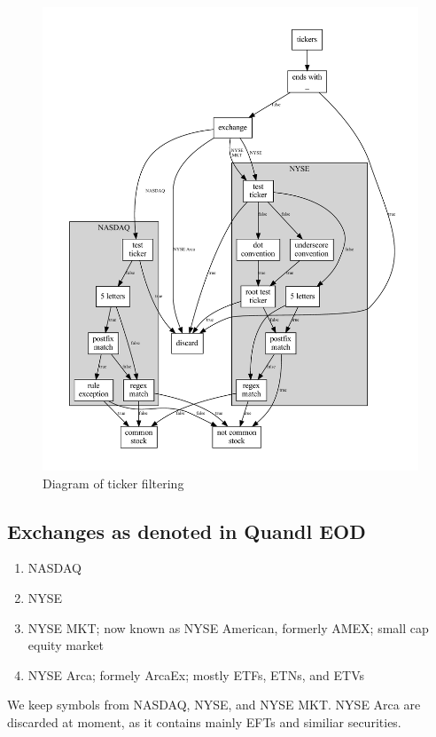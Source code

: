 \documentclass[8pt,oneside]{book}
\begin{document}
\begin{figure}
    \caption{Diagram of ticker filtering}
    \includegraphics[scale=0.6]{filter.pdf}
\end{figure}

\subsection{Exchanges as denoted in Quandl EOD}

\begin{enumerate}
    \item NASDAQ
    \item NYSE
    \item NYSE MKT; now known as NYSE American, formerly AMEX; small cap equity market
    \item NYSE Arca; formely ArcaEx; mostly ETFs, ETNs, and ETVs
\end{enumerate}

We keep symbols from NASDAQ, NYSE, and NYSE MKT. NYSE Arca are discarded at moment, as it contains mainly
EFTs and similiar securities.
\end{document}
